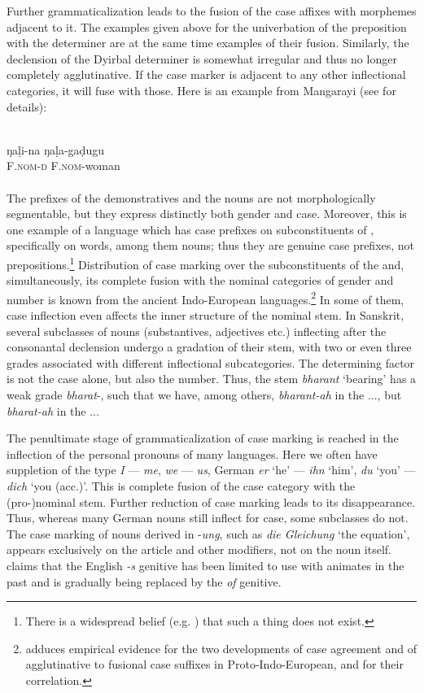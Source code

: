Further grammaticalization leads to the fusion of the case affixes with morphemes adjacent to it. The examples given above for the univerbation of the preposition with the determiner are at the same time examples of their fusion. Similarly, the declension of the Dyirbal determiner is somewhat irregular and thus no longer completely agglutinative. If the case marker is adjacent to any other inflectional categories, it will fuse with those. Here is an example from Mangarayi (see  for details):
  
\ea\label{ex:E61}
\\
\gll ŋa\d{l}i-na  ŋa\d{l}a-ga\d{d}ugu\\
 F.\textsc{nom}-\textsc{d}  F.\textsc{nom}-woman\\
\\
\z
\noindent The prefixes of the demonstratives and the nouns are not morphologically segmentable, but they express distinctly both gender and case. Moreover, this is one example of a language which has case prefixes on subconstituents of \nps, specifically on words, among them nouns; thus they are genuine case prefixes, not prepositions.\footnote{There is a widespread belief (e.g. \citealt[135--140]{Kahr1976}) that such a thing does not exist.} Distribution of case marking over the subconstituents of the \np and, simultaneously, its complete fusion with the nominal categories of gender and number is known from the ancient Indo-European languages.\footnote{\citet{Haudry1980} adduces empirical evidence for the two developments of case agreement and of agglutinative to fusional case suffixes in Proto-Indo-European, and for their correlation.} In some of them, case inflection even affects the inner structure of the nominal stem. In Sanskrit, several subclasses of nouns (substantives, adjectives etc.) inflecting after the consonantal declension undergo a gradation of their stem, with two or even three grades associated with different inflectional subcategories. The determining factor is not the case alone, but also the number. Thus, the stem \textit{bharant} ‘bearing’ has a weak grade \textit{bharat}{}-, such that we have, among others, \textit{bharant-ah} in the \glnom.\glpl.\glm., but \textit{bharat-ah} in the \glacc.\glpl.\glm.

The penultimate stage of grammaticalization of case marking is reached in the inflection of the personal pronouns of many languages. Here we often have suppletion of the type \textit{I} — \textit{me}, \textit{we} — \textit{us}, German \textit{er} ‘he’ — \textit{ihn} ‘him’, \textit{du} ‘you’ — \textit{dich} ‘you (acc.)’. This is complete fusion of the case category with the \mbox{(pro-)}nominal stem. Further reduction of case marking leads to its disappearance. Thus, where\-as many German nouns still inflect for case, some subclasses do not. The case marking of nouns derived in -\textit{ung}, such as \textit{die Gleichung} ‘the equation’, appears exclusively on the article and other modifiers, not on the noun itself. \citet[164f]{Sapir1921} claims that the English \textit{{}-s} genitive has been limited to use with animates in the past and is gradually being replaced by the \textit{of} genitive.

